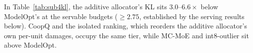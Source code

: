 

In Table~\ref{tab:sub4kl}, the additive allocator's KL sits $3.0$--$6.6\times$ below ModelOpt's at
the servable budgets ($\ge 2.75$, established by the serving results below). CoopQ and the isolated
ranking, which reorders the additive allocator's own per-unit damages, occupy the same tier, while
MC-MoE and int8-outlier sit above ModelOpt. 


